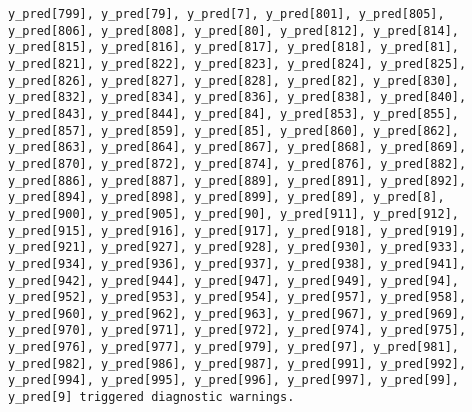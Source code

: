 \documentclass[
  letterpaper,
  DIV=11,
  numbers=noendperiod]{scrartcl}
\begin{document}
\begin{verbatim}
y_pred[799], y_pred[79], y_pred[7], y_pred[801], y_pred[805],
y_pred[806], y_pred[808], y_pred[80], y_pred[812], y_pred[814],
y_pred[815], y_pred[816], y_pred[817], y_pred[818], y_pred[81],
y_pred[821], y_pred[822], y_pred[823], y_pred[824], y_pred[825],
y_pred[826], y_pred[827], y_pred[828], y_pred[82], y_pred[830],
y_pred[832], y_pred[834], y_pred[836], y_pred[838], y_pred[840],
y_pred[843], y_pred[844], y_pred[84], y_pred[853], y_pred[855],
y_pred[857], y_pred[859], y_pred[85], y_pred[860], y_pred[862],
y_pred[863], y_pred[864], y_pred[867], y_pred[868], y_pred[869],
y_pred[870], y_pred[872], y_pred[874], y_pred[876], y_pred[882],
y_pred[886], y_pred[887], y_pred[889], y_pred[891], y_pred[892],
y_pred[894], y_pred[898], y_pred[899], y_pred[89], y_pred[8],
y_pred[900], y_pred[905], y_pred[90], y_pred[911], y_pred[912],
y_pred[915], y_pred[916], y_pred[917], y_pred[918], y_pred[919],
y_pred[921], y_pred[927], y_pred[928], y_pred[930], y_pred[933],
y_pred[934], y_pred[936], y_pred[937], y_pred[938], y_pred[941],
y_pred[942], y_pred[944], y_pred[947], y_pred[949], y_pred[94],
y_pred[952], y_pred[953], y_pred[954], y_pred[957], y_pred[958],
y_pred[960], y_pred[962], y_pred[963], y_pred[967], y_pred[969],
y_pred[970], y_pred[971], y_pred[972], y_pred[974], y_pred[975],
y_pred[976], y_pred[977], y_pred[979], y_pred[97], y_pred[981],
y_pred[982], y_pred[986], y_pred[987], y_pred[991], y_pred[992],
y_pred[994], y_pred[995], y_pred[996], y_pred[997], y_pred[99],
y_pred[9] triggered diagnostic warnings.
 

\end{verbatim}
\end{document}
